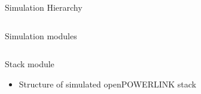 \begin{frame}{Simulation Hierarchy}
\begin{columns}
\begin{column}{0.5\textwidth}
        \end{column}
    \end{columns}
\end{frame}

\begin{frame}{Simulation modules}
    \begin{columns}
        \begin{column}{0.5\textwidth}
            \begin{block}{Stack module}
                \begin{itemize}
                    \item Structure of simulated openPOWERLINK stack
                \end{itemize}
            \end{block}
            

\end{column}
\end{columns}
\end{frame}
